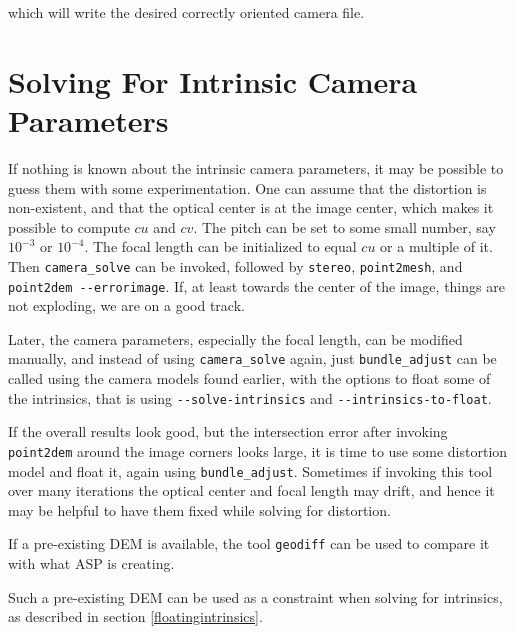 which will write the desired correctly oriented camera file. 

\section{Solving For Intrinsic Camera Parameters}
\label{findintrinsics}

If nothing is known about the intrinsic camera parameters, it may be
possible to guess them with some experimentation. One can assume that
the distortion is non-existent, and that the optical center is at the
image center, which makes it possible to compute $cu$ and $cv$. The
pitch can be set to some small number, say $10^{-3}$ or $10^{-4}.$ The
focal length can be initialized to equal $cu$ or a multiple of it. Then
\texttt{camera\_solve} can be invoked, followed by \texttt{stereo},
\texttt{point2mesh}, and \texttt{point2dem -\/-errorimage}. If, at least
towards the center of the image, things are not exploding, we are on a
good track.

Later, the camera parameters, especially the focal length, can be
modified manually, and instead of using \texttt{camera\_solve} again,
just \texttt{bundle\_adjust} can be called using the camera models found
earlier, with the options to float some of the intrinsics, that is using
\texttt{-\/-solve-intrinsics} and \texttt{-\/-intrinsics-to-float}.

If the overall results look good, but the intersection error after invoking \texttt{point2dem} around the image corners
looks large, it is time to use some distortion model and float it, again using \texttt{bundle\_adjust}. 
Sometimes if invoking this tool over many iterations the optical center and focal length may drift, and hence it may be
helpful to have them fixed while solving for distortion. 

If a pre-existing DEM is available, the tool \texttt{geodiff} can be used to compare it with what ASP is creating. 

Such a pre-existing DEM can be used as a constraint when solving for intrinsics, as described in section \ref{floatingintrinsics}.

